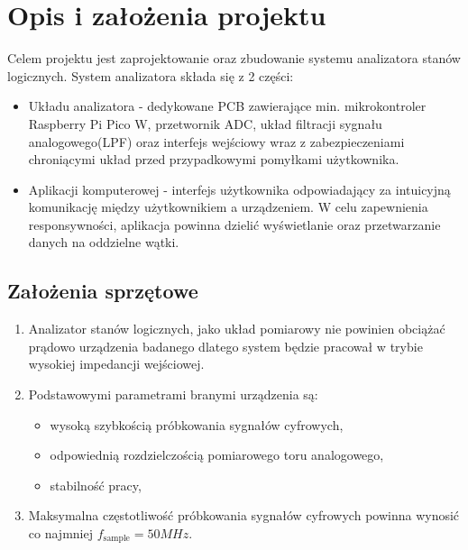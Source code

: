\section{Opis i założenia projektu}
    Celem projektu jest zaprojektowanie oraz zbudowanie systemu analizatora stanów logicznych.
    System analizatora składa się z 2 części:
    \begin{itemize}
        \item Układu analizatora - dedykowane PCB zawierające min. mikrokontroler
        Raspberry Pi Pico W, przetwornik ADC, układ filtracji sygnału analogowego(LPF)
        oraz interfejs wejściowy wraz z zabezpieczeniami chroniącymi układ przed przypadkowymi
        pomyłkami użytkownika.
        \item Aplikacji komputerowej - interfejs użytkownika odpowiadający za intuicyjną
        komunikację między użytkownikiem a urządzeniem. 
        W celu zapewnienia responsywności, aplikacja powinna dzielić wyświetlanie oraz przetwarzanie danych na oddzielne wątki.
    \end{itemize}

\subsection{Założenia sprzętowe}
    \begin{enumerate}
        \item Analizator stanów logicznych, jako układ pomiarowy nie powinien obciążać prądowo
        urządzenia badanego dlatego system będzie pracował w trybie
        wysokiej impedancji wejściowej.
        \item Podstawowymi parametrami branymi urządzenia są:
        \begin{itemize}
            \item wysoką szybkością próbkowania sygnałów cyfrowych,
            \item odpowiednią rozdzielczością pomiarowego toru analogowego,
            \item stabilność pracy,
        \end{itemize}
        \item Maksymalna częstotliwość próbkowania sygnałów cyfrowych powinna wynosić co najmniej $f_{\text{sample}} = 50MHz$.
    \end{enumerate}

